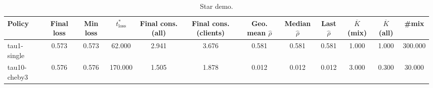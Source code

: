 \begin{table}[t]
\centering
\begin{tabular}{lccccccccccc}
\toprule
Policy & Final loss & Min loss & $t^*_{\text{loss}}$ & Final cons. (all) & Final cons. (clients) & Geo. mean $\widehat{\rho}$ & Median $\widehat{\rho}$ & Last $\widehat{\rho}$ & $\overline{K}$ (mix) & $\overline{K}$ (all) & #mix \\
\midrule
tau1-single & 0.573 & 0.573 & 62.000 & 2.941 & 3.676 & 0.581 & 0.581 & 0.581 & 1.000 & 1.000 & 300.000 \\
tau10-cheby3 & 0.576 & 0.576 & 170.000 & 1.505 & 1.878 & 0.012 & 0.012 & 0.012 & 3.000 & 0.300 & 30.000 \\
\bottomrule
\end{tabular}
\caption{Star demo.}
\label{tab:star_demo}
\end{table}